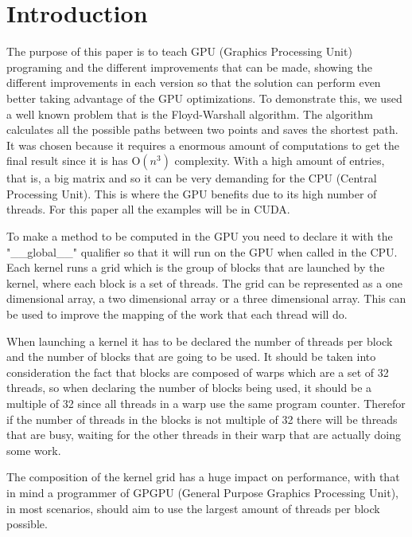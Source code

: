 \documentclass[conference]{IEEEtran}
\begin{document}
\section{Introduction}
The purpose of this paper is to teach GPU (Graphics Processing Unit) programing and the different improvements that can be made, showing the different improvements in each version so that the solution can perform even better taking advantage of the GPU optimizations. To demonstrate this, we used a well known problem that is the Floyd-Warshall algorithm. The algorithm calculates all the possible paths between two points and saves the shortest path. It was chosen because it requires a enormous amount of computations to get the final result since it is has O$(n^{3})$ complexity. With a high amount of entries, that is, a big matrix and so it can be very demanding for the CPU (Central Processing Unit). This is where the GPU benefits due to its high number of threads.
\newline
For this paper all the examples will be in CUDA. %

To make a method to be computed in the GPU you need to declare it with the "\_\_global\_\_" qualifier so that it will run on the GPU when called in the CPU. Each kernel runs a grid which is the group of blocks that are launched by the kernel, where each block is a set of threads. The grid can be represented as a one dimensional array, a two dimensional array or a three dimensional array. This can be used to improve the mapping of the work that each thread will do. 

When launching a kernel it has to be declared the number of threads per block and the number of blocks that are going to be used. It should be taken into consideration the fact that blocks are composed of warps which are a set of 32 threads, so when declaring the number of blocks being used, it should be a multiple of 32 since all threads in a warp use the same program counter. Therefor if the number of threads in the blocks is not multiple of 32 there will be threads that are busy, waiting for the other threads in their warp that are actually doing some work.

The composition of the kernel grid has a huge impact on performance, with that in mind a programmer of GPGPU (General Purpose Graphics Processing Unit), in most scenarios, should aim to use the largest amount of threads per block possible.
\end{document}
